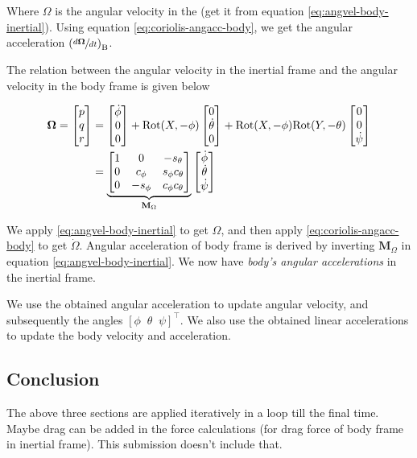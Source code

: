 Where $\Omega$ is the angular velocity in the (get it from equation \ref{eq:angvel-body-inertial}). Using equation \ref{eq:coriolis-angacc-body}, we get the angular acceleration $\left ( \sfrac{d \mathbf{\Omega}}{dt} \right )_{\textup{B}}$.

The relation between the angular velocity in the inertial frame and the angular velocity in the body frame is given below

\begin{align}
    \mathbf{\Omega} = \begin{bmatrix}
        p \\ q \\ r
    \end{bmatrix} &= \begin{bmatrix}
        \dot{\phi} \\ 0 \\ 0
        \end{bmatrix} + \textup{Rot}(X, -\phi) \begin{bmatrix}
        0 \\ \dot{\theta} \\ 0
        \end{bmatrix} + \textup{Rot}(X, -\phi) \textup{Rot}(Y, -\theta) \begin{bmatrix}
        0 \\ 0 \\ \dot{\psi}
        \end{bmatrix}
        \nonumber \\
    &= \underset{\mathbf{M}_\Omega}{\underbrace{\begin{bmatrix}
        1 & 0 & -s_\theta \\
        0 & c_\phi & s_\phi c_\theta \\
        0 & -s_\phi & c_\phi c_\theta
        \end{bmatrix}}} \begin{bmatrix}
            \dot{\phi} \\ \dot{\theta} \\ \dot{\psi}
        \end{bmatrix}
    \label{eq:angvel-body-inertial}
\end{align}

We apply \ref{eq:angvel-body-inertial} to get $\Omega$, and then apply \ref{eq:coriolis-angacc-body} to get $\dot{\Omega}$. Angular acceleration of body frame is derived by inverting $\mathbf{M}_\Omega$ in equation \ref{eq:angvel-body-inertial}. We now have \emph{body's angular accelerations} in the inertial frame.

We use the obtained angular acceleration to update angular velocity, and subsequently the angles $[\phi\;\;\theta\;\;\psi]^\top$. We also use the obtained linear accelerations to update the body velocity and acceleration.

\subsection{Conclusion}

The above three sections are applied iteratively in a loop till the final time. Maybe drag can be added in the force calculations (for drag force of body frame in inertial frame). This submission doesn't include that.
